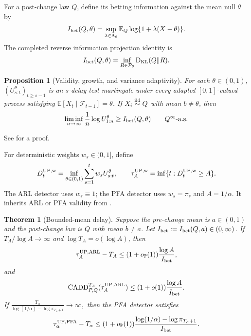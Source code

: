 \documentclass[12pt]{article}
\theoremstyle{spaced}
\newtheorem{theorem}{Theorem}[section]
\newtheorem{proposition}[proposition]{Proposition}
\theoremstyle{remark}
\newcommand{\E}{\mathbb E}
\newcommand{\bbP}{\mathbb P}
\newcommand{\KL}{\mathrm{D}_{\text{KL}}}
\newcommand{\kl}{\mathrm{kl}}
\newcommand{\CADD}{\mathrm{CADD}}
\begin{document}
For a post-change law $Q$, define its betting information against the mean
null $\theta$ by
\begin{equation}
\label{eq:bounded-betting-information}
 I_{\rm bet}(Q,\theta)
 =\sup_{\lambda\in\Lambda_\theta}
   \E_Q\log\{1+\lambda(X-\theta)\}.
\end{equation}
The completed reverse information projection identity is
\begin{equation}
\label{eq:bounded-betting-ripr-main}
 I_{\rm bet}(Q,\theta)
 =\inf_{R\in\mathcal P_\theta}\KL(Q\|R).
\end{equation}

\begin{proposition}[Validity, growth, and variance adaptivity]
\label{prop:bounded-UP-growth-main}
For each $\theta\in(0,1)$, $(U_{s:t}^{\theta})_{t\ge s-1}$ is an $s$-delay
test martingale under every adapted $[0,1]$-valued process satisfying
$\E[X_t\mid\mathcal F_{t-1}]=\theta$.  If
$X_i\stackrel{\rm iid}{\sim}Q$ with mean $b\ne\theta$, then
\[
 \liminf_{n\to\infty}\frac1n\log U_{1:n}^{\theta}
 \ge I_{\rm bet}(Q,\theta)
 \qquad Q^\infty\text{-a.s.}
\]
\end{proposition}

  See
 for a proof.

For deterministic weights $w_s\in(0,1]$, define
\begin{equation}
\label{eq:bounded-UP-detector-main}
 D_t^{\rm UP,w}=\inf_{\theta\in(0,1)}
       \sum_{s=1}^t w_sU_{s:t}^{\theta},
 \qquad
 \tau_A^{\rm UP,w}=\inf\{t:D_t^{\rm UP,w}\ge A\}.
\end{equation}
The ARL detector uses $w_s\equiv1$; the PFA detector uses $w_s=\pi_s$ and
$A=1/\alpha$.
It inherits ARL or PFA validity from
.
\begin{theorem}[Bounded-mean delay]
\label{thm:bounded-main-delay}
Suppose the pre-change mean is $a\in(0,1)$ and the post-change law is $Q$ with
mean $b\ne a$.  Let $I_{\rm bet}:=I_{\rm bet}(Q,a)\in(0,\infty)$.
If $T_A/\log A\to\infty$ and $\log T_A=o(\log A)$, then
\[
 \tau_A^{\rm UP,ARL}-T_A
 \le(1+o_{\bbP}(1))\frac{\log A}{I_{\rm bet}},
\]
and
\[
 \CADD_{P,Q}^{T_A}(\tau_A^{\rm UP,ARL})
 \le(1+o(1))\frac{\log A}{I_{\rm bet}}.
\]
If
$\frac{T_\alpha}
 {\log(1/\alpha)-\log\pi_{T_\alpha+1}}\to\infty,$
then the PFA detector satisfies
\[
 \tau_\alpha^{\rm UP,PFA}-T_\alpha
 \le(1+o_{\bbP}(1))
 \frac{\log(1/\alpha)-\log\pi_{T_\alpha+1}}{I_{\rm bet}}.
\]
\end{theorem}
\end{document}
